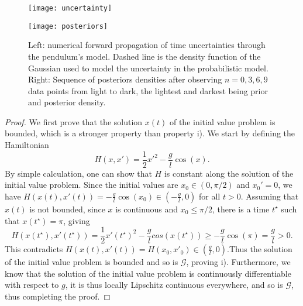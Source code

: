 \begin{figure}[t!]
  \begin{minipage}{.5\textwidth}
    \texttt{[image: uncertainty]}
  \end{minipage}
  \begin{minipage}{.5\textwidth}
    \texttt{[image: posteriors]}
  \end{minipage}
  \caption{Left: numerical forward propagation of time uncertainties through the pendulum's model. Dashed line is the density function of the Gaussian used to model the uncertainty in the probabilistic model. Right: Sequence of posteriors densities after observing $n=0, 3, 6, 9$ data points from light to dark, the lightest and darkest being prior and posterior density. }
  \label{uncertainty-posteriors}
\end{figure}


\begin{proof}
  We first prove that the solution $x(t)$ of the initial value problem is bounded, which is a stronger property than property i). We start by defining the Hamiltonian
  \begin{equation*}
    H(x, x') = \frac12 x'^2 - \frac{g}{l}\cos(x).
  \end{equation*}
  By simple calculation, one can show that $H$ is constant along the solution of the initial value problem. Since the initial values are $x_0 \in (0, \pi/2)$ and $x_0' = 0$, we have $H(x(t), x'(t)) = -\frac{g}{l}\cos(x_0) \in (-\frac{g}{l}, 0)$ for all $t > 0$. Assuming that $x(t)$ is not bounded, since $x$ is continuous and $x_0 \le \pi/2$, there is a time $t^\star$ such that $x(t^\star) = \pi$, giving
  \begin{equation*}
    H(x(t^\star), x'(t^\star)) = \frac12 x'(t^\star)^2 - \frac{g}{l}cos(x(t^\star)) \ge -\frac{g}{l}\cos(\pi) = \frac{g}{l} > 0.
  \end{equation*}
  This contradicts $H(x(t), x'(t)) = H(x_0, x'_0) \in (\frac{g}{l}, 0)$.Thus the solution of the initial value problem is bounded and so is $\mathcal{G}$, proving i).
  Furthermore, we know that the solution of the initial value problem is continuously differentiable with respect to $g$, it is thus locally Lipschitz continuous everywhere, and so is $\mathcal{G}$, thus completing the proof.
\end{proof}


